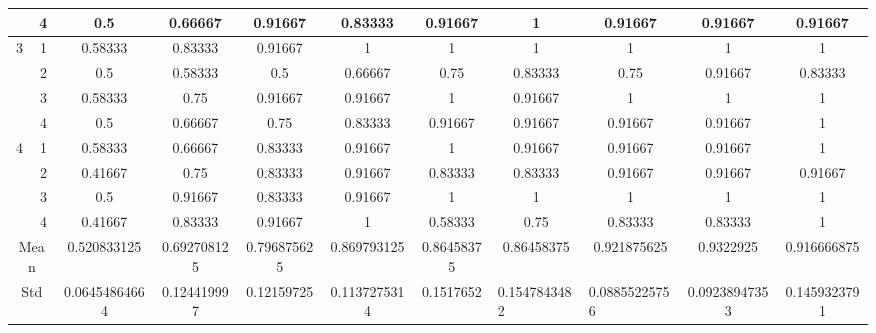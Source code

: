 \documentclass[draft,dvipsnames]{drexel-thesis}
\begin{document}
\begin{thesis}
\begin{table}[!t]
{\begin{tabular}{|c|c|c|c|c|c|c|c|c|c|c|}
                      & 4                   & 0.5           & 0.66667     & 0.91667     & 0.83333      & 0.91667    & 1                                 & 0.91667                            & 0.91667       & 0.91667      \\ \hline
\multirow{4}{*}{3}    & 1                   & 0.58333       & 0.83333     & 0.91667     & 1            & 1          & 1                                 & 1                                  & 1             & 1            \\ \cline{2-11}
                      & 2                   & 0.5           & 0.58333     & 0.5         & 0.66667      & 0.75       & 0.83333                           & 0.75                               & 0.91667       & 0.83333      \\ \cline{2-11}
                      & 3                   & 0.58333       & 0.75        & 0.91667     & 0.91667      & 1          & 0.91667                           & 1                                  & 1             & 1            \\ \cline{2-11}
                      & 4                   & 0.5           & 0.66667     & 0.75        & 0.83333      & 0.91667    & 0.91667                           & 0.91667                            & 0.91667       & 1            \\ \hline
\multirow{4}{*}{4}    & 1                   & 0.58333       & 0.66667     & 0.83333     & 0.91667      & 1          & 0.91667                           & 0.91667                            & 0.91667       & 1            \\ \cline{2-11}
                      & 2                   & 0.41667       & 0.75        & 0.83333     & 0.91667      & 0.83333    & 0.83333                           & 0.91667                            & 0.91667       & 0.91667      \\ \cline{2-11}
                      & 3                   & 0.5           & 0.91667     & 0.83333     & 0.91667      & 1          & 1                                 & 1                                  & 1             & 1            \\ \cline{2-11}
                      & 4                   & 0.41667       & 0.83333     & 0.91667     & 1            & 0.58333    & 0.75                              & 0.83333                            & 0.83333       & 1            \\ \hline
\multicolumn{2}{|c|}{Mean}                  & 0.520833125   & 0.692708125 & 0.796875625 & 0.869793125  & 0.86458375 & 0.86458375                        & 0.921875625                        & 0.9322925     & 0.916666875  \\ \hline
\multicolumn{2}{|c|}{Std}                   & 0.06454864664 & 0.124419997 & 0.12159725  & 0.1137275314 & 0.1517652  & \multicolumn{1}{l|}{0.1547843482} & \multicolumn{1}{l|}{0.08855225756} & 0.09238947353 & 0.1459323791 \\ \hline
\end{tabular}}
\end{table}


\end{thesis}
\end{document}
